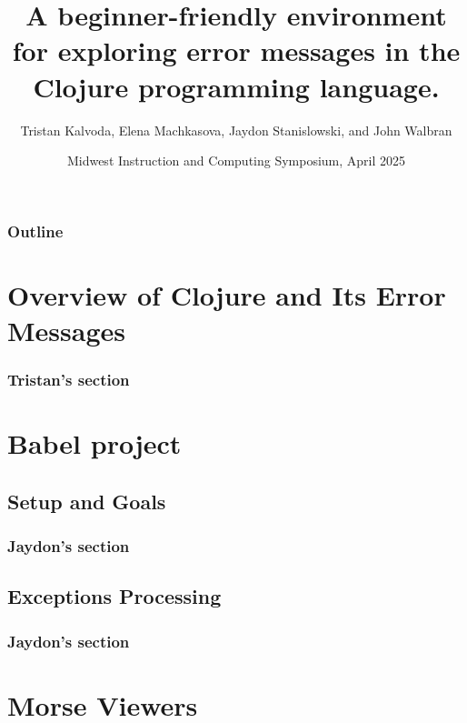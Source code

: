 \documentclass{beamer}
\begin{document}
\title{A beginner-friendly environment for exploring error messages in the Clojure programming language.}
\author{Tristan Kalvoda, Elena Machkasova, Jaydon Stanislowski, and John Walbran}
\date[]  
{Midwest Instruction and Computing Symposium, April 2025}

\begin{frame}
  \titlepage
\end{frame}

\begin{frame}

  \frametitle{Outline}
\tableofcontents
\end{frame}

\section{Overview of Clojure and Its Error Messages}

\begin{frame}
\frametitle{Tristan's section}

\end{frame}

\section{Babel project}

\subsection{Setup and Goals}

\begin{frame}
\frametitle{Jaydon's section}

\end{frame}

\subsection{Exceptions Processing}

\begin{frame}
\frametitle{Jaydon's section}

\end{frame}

\section{Morse Viewers}
\end{document}
